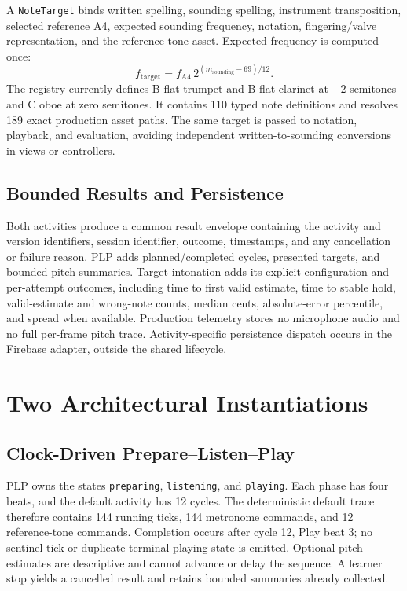 \documentclass[runningheads]{llncs}
\begin{document}
A \texttt{NoteTarget} binds written spelling, sounding spelling,
instrument transposition, selected reference A4, expected sounding frequency,
notation, fingering/valve representation, and the reference-tone asset.
Expected frequency is computed once:
\[
 f_{\mathrm{target}} = f_{\mathrm{A4}}\,
 2^{(m_{\mathrm{sounding}}-69)/12}.
\]
The registry currently defines B-flat trumpet and B-flat clarinet at
$-2$ semitones and C oboe at zero semitones. It contains 110 typed note
definitions and resolves 189 exact production asset paths. The same target is
passed to notation, playback, and evaluation, avoiding independent
written-to-sounding conversions in views or controllers.

\subsection{Bounded Results and Persistence}

Both activities produce a common result envelope containing the activity and
version identifiers, session identifier, outcome, timestamps, and any
cancellation or failure reason. PLP adds planned/completed cycles, presented
targets, and bounded pitch summaries. Target intonation adds its explicit
configuration and per-attempt outcomes, including time to first valid
estimate, time to stable hold, valid-estimate and wrong-note counts, median
cents, absolute-error percentile, and spread when available. Production
telemetry stores no microphone audio and no full per-frame pitch trace.
Activity-specific persistence dispatch occurs in the Firebase adapter, outside
the shared lifecycle.

\section{Two Architectural Instantiations}\label{sec:instantiations}

\subsection{Clock-Driven Prepare--Listen--Play}

PLP owns the states \texttt{preparing}, \texttt{listening}, and
\texttt{playing}. Each phase has four beats, and the default activity has 12
cycles. The deterministic default trace therefore contains 144 running ticks,
144 metronome commands, and 12 reference-tone commands. Completion occurs
after cycle 12, Play beat 3; no sentinel tick or duplicate terminal playing
state is emitted. Optional pitch estimates are descriptive and cannot advance
or delay the sequence. A learner stop yields a cancelled result and retains
bounded summaries already collected.
\end{document}
